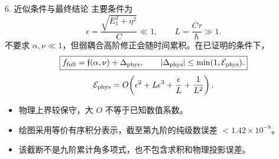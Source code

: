 \documentclass[aspectratio=169,11pt]{beamer}
\begin{document}
\begin{frame}[t]{6. 近似条件与最终结论}
  \small
  \setlength{\abovedisplayskip}{5pt}\setlength{\belowdisplayskip}{5pt}
  主要条件为
  \[
    \epsilon=\frac{\sqrt{E_1^2+\eta^2}}C\ll1,\qquad L=\frac{C\tau}{\hbar}\gg1.
  \]
  不要求 $\alpha,\nu\ll1$，但弱耦合高阶修正会随时间累积。在已证明的条件下，
  \[
    \boxed{f_{\rm full}=\mathfrak f(\alpha,\nu)+\Delta_{\rm phys},\qquad
      |\Delta_{\rm phys}|\le\min(1,\mathcal E_{\rm phys}).}
  \]
  \[
    \mathcal E_{\rm phys}
      =O\!\left(\epsilon^2+L\epsilon^3+\frac\epsilon L+\frac1{L^2}\right).
  \]
  \begin{itemize}\setlength{\itemsep}{.1cm}
    \item 物理上界较保守，大 $O$ 不等于已知数值系数。
    \item 绘图采用等价有序积分表示，截至第九阶的纯级数误差 $<1.42\times10^{-8}$。
    \item 该截断不是九阶累计角多项式，也不包含求积和物理投影误差。
  \end{itemize}
\end{frame}
\end{document}
